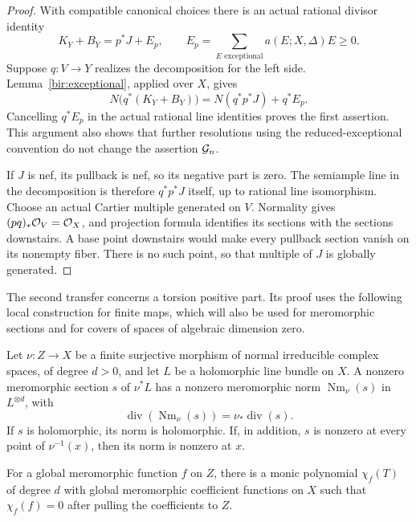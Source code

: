 \begin{proof}
With compatible canonical choices there is an actual rational divisor
identity
\[
 K_Y+B_Y=p^*J+E_p,\qquad
 E_p=\sum_{E\text{ exceptional}}a(E;X,\Delta)E\geq0.
\]
Suppose \(q:V\to Y\) realizes the decomposition for the left side.
Lemma~\ref{bir:exceptional}, applied over \(X\), gives
\[
 N\bigl(q^*(K_Y+B_Y)\bigr)
 =N(q^*p^*J)+q^*E_p.
\]
Cancelling \(q^*E_p\) in the actual rational line identities proves the
first assertion. This argument also shows that further resolutions using
the reduced-exceptional convention do not change the assertion
\(\mathcal G_n\).

If \(J\) is nef, its pullback is nef, so its negative part is zero. The
semiample line in the decomposition is therefore \(q^*p^*J\) itself, up
to rational line isomorphism. Choose an actual Cartier multiple generated
on \(V\). Normality gives \((p q)_*\mathcal O_V=\mathcal O_X\), and projection formula
identifies its sections with the sections downstairs. A base point
downstairs would make every pullback section vanish on its nonempty fiber.
There is no such point, so that multiple of \(J\) is globally generated.
\end{proof}

The second transfer concerns a torsion positive part. Its proof uses the
following local construction for finite maps, which will also be used for
meromorphic sections and for covers of spaces of algebraic dimension zero.

\begin{lemma}
\label{bir:finite-norm}
Let \(\nu:Z\to X\) be a finite surjective morphism of normal irreducible
complex spaces, of degree \(d>0\), and let \(L\) be a holomorphic line
bundle on \(X\). A nonzero meromorphic section \(s\) of \(\nu^*L\)
has a nonzero meromorphic norm \(\operatorname{Nm}_\nu(s)\) in
\(L^{\otimes d}\), with
\[
 \operatorname{div}(\operatorname{Nm}_\nu(s))
   =\nu_*\operatorname{div}(s).
\]
If \(s\) is holomorphic, its norm is holomorphic. If, in addition,
\(s\) is nonzero at every point of \(\nu^{-1}(x)\), then its norm is
nonzero at \(x\).

For a global meromorphic function \(f\) on \(Z\), there is a monic
polynomial \(\chi_f(T)\) of degree \(d\) with global meromorphic
coefficient functions on \(X\) such that \(\chi_f(f)=0\) after pulling
the coefficients to \(Z\).
\end{lemma}


